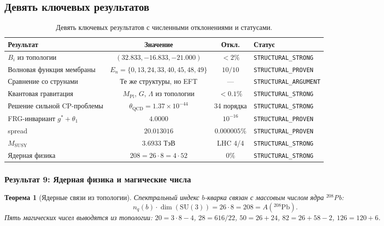 \documentclass[11pt,a4paper]{article}
\newcommand{\SU}{\ensuremath{\mathrm{SU}}}
\newtheorem{theorem}{Теорема}[section]
\theoremstyle{definition}
\begin{document}
\subsection{Девять ключевых результатов}
\label{subsec:conclusions-nine-results}
\begin{table}[htbp]
\centering
\caption{Девять ключевых результатов с численными отклонениями и статусами.}
\label{tab:nine-results-summary}
\begin{tabular}{lccl}
\toprule
Результат & Значение & Откл. & Статус \\
\midrule
$B_i$ из топологии 
    & $(32.833, -16.833, -21.000)$ 
    & $< 2\%$ 
    & \texttt{STRUCTURAL\_STRONG} \\[0.3em]
Волновая функция мембраны 
    & $E_n = \{0,13,24,33,40,45,48,49\}$ 
    & $10/10$ 
    & \texttt{STRUCTURAL\_PROVEN} \\[0.3em]
Сравнение со струнами
    & Те же структуры, но EFT
    & ---
    & \texttt{STRUCTURAL\_ARGUMENT} \\[0.3em]
Квантовая гравитация
    & $M_{\text{Pl}}$, $G$, $\Lambda$ из топологии
    & $< 0.1\%$
    & \texttt{STRUCTURAL\_STRONG} \\[0.3em]
Решение сильной CP-проблемы
    & $\theta_{\text{QCD}} = 1.37 \times 10^{-44}$
    & 34 порядка
    & \texttt{STRUCTURAL\_STRONG} \\[0.3em]
FRG-инвариант $g^*+\theta_1$ 
    & $4.0000$ 
    & $10^{-16}$ 
    & \texttt{STRUCTURAL\_PROVEN} \\[0.3em]
spread 
    & $20.013016$ 
    & $0.000005\%$ 
    & \texttt{STRUCTURAL\_PROVEN} \\[0.3em]
$M_{\text{SUSY}}$ 
    & $3.6933$ ТэВ 
    & LHC 4/4 
    & \texttt{STRUCTURAL\_STRONG} \\[0.3em]
Ядерная физика
    & $208 = 26 \cdot 8 = 4 \cdot 52$
    & $0\%$
    & \texttt{STRUCTURAL\_STRONG} \\
\bottomrule
\end{tabular}
\end{table}

\subsubsection{Результат 9: Ядерная физика и магические числа}

\begin{theorem}[Ядерные связи из топологии]
\label{thm:conclusion-nuclear}
Спектральный индекс $b$-кварка связан с массовым числом
ядра $^{208}$Pb:
\begin{equation}
    n_q(b) \cdot \dim(\SU(3)) = 26 \cdot 8 = 208 = A(^{208}\text{Pb}).
\end{equation}
Пять магических чисел выводятся из топологии:
$20 = 3 \cdot 8 - 4$, $28 = 616/22$, $50 = 26 + 24$,
$82 = 26 + 58 - 2$, $126 = 120 + 6$.
\end{theorem}
\end{document}
